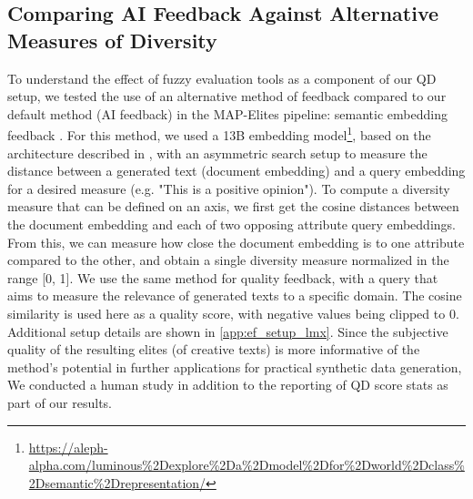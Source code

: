 \clearpage
\newpage
\subsection{Comparing AI Feedback Against Alternative Measures of Diversity}\label{main:alt_feedback}



To understand the effect of fuzzy evaluation tools as a component of our QD setup, we tested the use of an alternative method of feedback compared to our default method (AI feedback) in the MAP-Elites pipeline: semantic embedding feedback \citep{reimers2019sentence}. For this method, we used a 13B embedding model\footnote[1]{\url{https://aleph-alpha.com/luminous\%2Dexplore\%2Da\%2Dmodel\%2Dfor\%2Dworld\%2Dclass\%2Dsemantic\%2Drepresentation/}}, based on the architecture described in \citet{sgpt}, with an asymmetric search setup to measure the distance between a generated text (document embedding) and a query embedding for a desired measure (e.g. "This is a positive opinion"). To compute a diversity measure that can be defined on an axis, we first get the cosine distances between the document embedding and each of two opposing attribute query embeddings. From this, we can measure how close the document embedding is to one attribute compared to the other, and obtain a single diversity measure normalized in the range [0, 1]. We use the same method for quality feedback, with a query that aims to measure the relevance of generated texts to a specific domain. The cosine similarity is used here as a quality score, with negative values being clipped to 0. Additional setup details are shown in \cref{app:ef_setup_lmx}. Since the subjective quality of the resulting elites (of creative texts) is more informative of the method's potential in further applications for practical synthetic data generation, We conducted a human study in addition to the reporting of QD score stats as part of our results.

